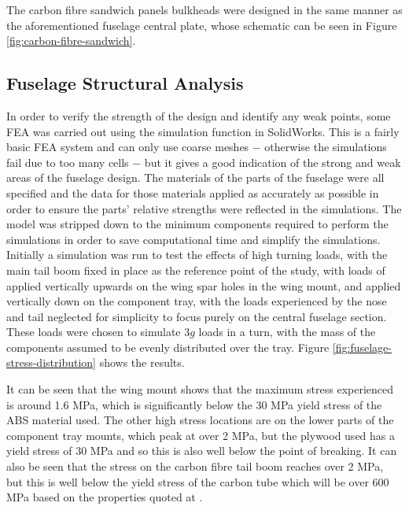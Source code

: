 \documentclass[../../main.tex]{subfiles}
\begin{document}
The carbon fibre sandwich panels bulkheads were designed in the same manner as the aforementioned fuselage central plate, whose schematic can be seen in Figure \ref{fig:carbon-fibre-sandwich}. 


\subsection{Fuselage Structural Analysis} \label{sec:final-design-proposal:fuselage:finite-element-analysis}

In order to verify the strength of the design and identify any weak points, some FEA was carried out using the simulation function in SolidWorks.
This is a fairly basic FEA system and can only use coarse meshes $-$ otherwise the simulations fail due to too many cells $-$ but it gives a good indication of the strong and weak areas of the fuselage design.
The materials of the parts of the fuselage were all specified and the data for those materials applied as accurately as possible in order to ensure the parts' relative strengths were reflected in the simulations.
The model was stripped down to the minimum components required to perform the simulations in order to save computational time and simplify the simulations.
Initially a simulation was run to test the effects of high turning loads, with the main tail boom fixed in place as the reference point of the study, with loads of  applied vertically upwards on the wing spar holes in the wing mount, and  applied vertically down on the component tray, with the loads experienced by the nose and tail neglected for simplicity to focus purely on the central fuselage section.
These loads were chosen to simulate $3g$ loads in a turn, with the mass of the components assumed to be evenly distributed over the tray.
Figure \ref{fig:fuselage-stress-distribution} shows the results.


It can be seen that the wing mount shows that the maximum stress experienced is around 1.6 MPa, which is significantly below the 30 MPa yield stress of the ABS material used.
The other high stress locations are on the lower parts of the component tray mounts, which peak at over 2 MPa, but the plywood used has a yield stress of 30 MPa and so this is also well below the point of breaking.
It can also be seen that the stress on the carbon fibre tail boom reaches over 2 MPa, but this is well below the yield stress of the carbon tube which will be over 600 MPa based on the properties quoted at \cite{unknown}. %
\end{document}
